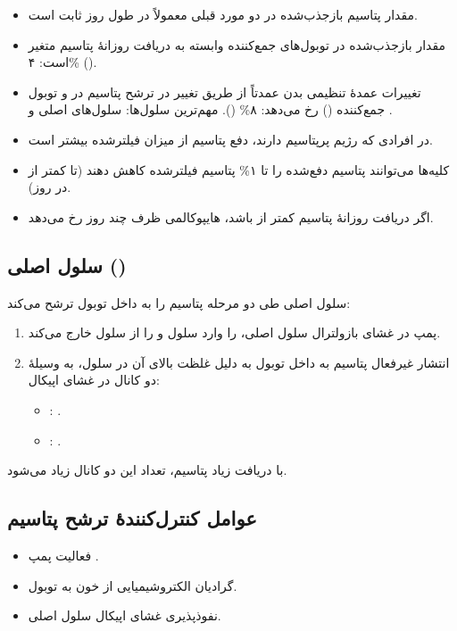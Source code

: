\documentclass[11pt,a4paper]{article}
\begin{document}
\begin{itemize}
\item مقدار پتاسیم بازجذب‌شده در دو مورد قبلی معمولاً در طول روز ثابت است.
\item مقدار بازجذب‌شده در توبول‌های جمع‌کننده وابسته به دریافت روزانهٔ پتاسیم متغیر است: ۴\% ().
\item تغییرات عمدهٔ تنظیمی بدن عمدتاً از طریق تغییر در ترشح پتاسیم در  و توبول جمع‌کننده () رخ می‌دهد: ۸\% (). مهم‌ترین سلول‌ها: سلول‌های اصلی  و .
\item در افرادی که رژیم پرپتاسیم دارند، دفع پتاسیم از میزان فیلترشده بیشتر است.
\item کلیه‌ها می‌توانند پتاسیم دفع‌شده را تا ۱\% پتاسیم فیلترشده کاهش دهند (تا کمتر از  در روز).
\item اگر دریافت روزانهٔ پتاسیم کمتر از  باشد، هایپوکالمی ظرف چند روز رخ می‌دهد.
\end{itemize}
\subsection*{سلول اصلی ()}
سلول اصلی طی دو مرحله پتاسیم را به داخل توبول ترشح می‌کند:
\begin{enumerate}
\item پمپ  در غشای بازولترال سلول اصلی،  را وارد سلول و  را از سلول خارج می‌کند.
\item انتشار غیرفعال پتاسیم به داخل توبول به دلیل غلظت بالای آن در سلول، به وسیلهٔ دو کانال در غشای اپیکال:
  \begin{itemize}
  \item {}: .
  \item {}: .
  \end{itemize}
\end{enumerate}
با دریافت زیاد پتاسیم، تعداد این دو کانال زیاد می‌شود.
\subsection*{عوامل کنترل‌کنندهٔ ترشح پتاسیم}
\begin{itemize}
\item فعالیت پمپ .
\item گرادیان الکتروشیمیایی از خون به توبول.
\item نفوذپذیری غشای اپیکال سلول اصلی.
\end{itemize}
\end{document}
